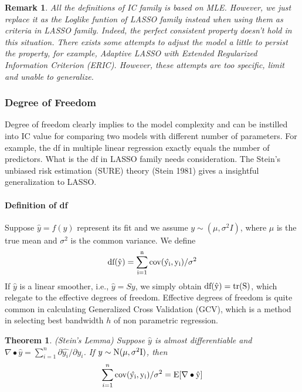 \documentclass[]{article}
\newtheorem{mythm}{Theorem}%
\newtheorem{remark}{Remark}
\begin{document}
\begin{remark}
	All the definitions of IC family is based on MLE. However, we just replace it as the Loglike funtion of LASSO family instead when using them as criteria in LASSO family. Indeed, the perfect consistent property doesn't hold in this situation. There exists some attempts to adjust the model a little to persist the property, for example, Adaptive LASSO\cite{zou2006adaptive} with Extended Regularized Information Criterion (ERIC)\cite{hui2015tuning}. However, these attempts are too specific, limit and unable to generalize.
\end{remark}

\subsubsection{Degree of Freedom}
Degree of freedom clearly implies to the model complexity and can be instilled into IC value for comparing two models with different number of parameters. For example, the \rm df in multiple linear regression exactly equals the number of predictors. What is the \rm df in LASSO family needs consideration. The Stein's unbiased risk estimation (SURE) theory (Stein 1981)\cite{stein1981estimation} gives a insightful generalization to LASSO.

\paragraph{Definition of df}
Suppose $ \hat{y}=f(y) $ represent its fit and we assume $ y\sim (\mu,\sigma^2I) $, where $\mu$ is the true mean and $ \sigma^2 $ is the common variance. We define
\begin{equation}
	\rm df(\hat{y})=\sum_{i=1}^{n}\rm cov(\hat{y_i},y_i)/\sigma^2
\end{equation}
If $ \hat{y} $ is a linear smoother, i.e., $ \hat{y}=Sy $, we simply obtain $ \rm df(\hat{y})=tr(S) $, which relegate to the effective degrees of freedom. Effective degrees of freedom\cite{huynh1976estimation} is quite common in calculating Generalized Cross Validation (GCV)\cite{golub1979generalized}, which is a method in selecting best bandwidth $ h $ of non parametric regression.
\begin{mythm}(Stein's Lemma)
	Suppose $ \hat{y} $ is almost differentiable and $ \nabla\bullet\hat{y}=\sum_{i=1}^{n}\partial\hat{y_i}/\partial y_i $. If $y\sim \rm N(\mu,\sigma^2I)$, then
	\begin{equation}
	\sum_{i=1}^{n}\rm cov(\hat{y_i},y_i)/\sigma^2=\rm E[\nabla\bullet\hat{y}]
	\end{equation}
\end{mythm}
\end{document}
